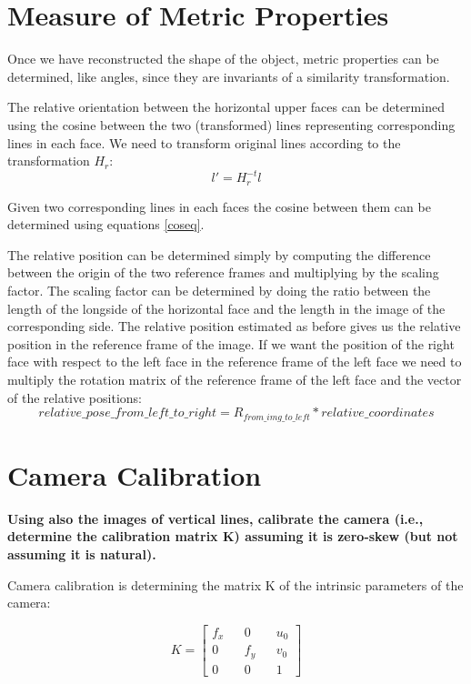 \documentclass[11pt, oneside]{article}   	%
\begin{document}
\section {Measure of Metric Properties} \label{metricprop}
Once we have reconstructed the shape of the object, metric properties can be determined, like angles, since they are invariants of a similarity transformation.

The relative orientation between the horizontal upper faces can be determined using the cosine between the two (transformed) lines representing corresponding lines in each face. We need to transform original lines according to the transformation $H_r$:
$$
l' = H_r^{-t}l
$$

Given two corresponding lines in each faces the cosine between them can be determined using equations \ref{coseq}.

The relative position can be determined simply by computing the difference between the origin of the two reference frames and multiplying by the scaling factor.
The scaling factor can be determined by doing the ratio between the length of the longside of the horizontal face and the length in the image of the corresponding side.
The relative position estimated as before gives us the relative position in the reference frame of the image. If we want the position of the right face with respect to the left face in the reference frame of the left face we need to multiply the rotation matrix of the reference frame of the left face and the vector of the relative positions:
$$
relative\_pose\_from\_left\_to\_right = R_{from\_img\_to\_left} * relative\_coordinates
$$
\section{Camera Calibration} \label{seccalib}
\textbf{Using also the images of vertical lines, calibrate the camera (i.e., determine the calibration matrix K) assuming it is zero-skew (but not assuming it is natural).} \hfill \break

Camera calibration is determining the matrix K of the intrinsic parameters of the camera:

\begin{equation} \label{keq}
K =
\begin{bmatrix}
f_x  && 0 && u_0 \\ 0 && f_y && v_0 \\ 0 && 0 && 1
\end{bmatrix}
\end{equation}
\end{document}
